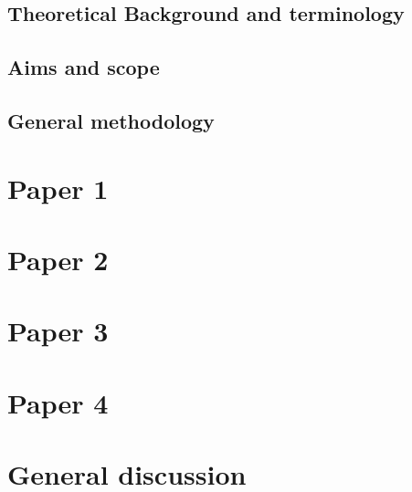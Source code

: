 \documentclass[11pt]{report}
\begin{document}
    \section{Theoretical Background and terminology}
    \label{sec:theory}
        

    \section{Aims and scope}
    \label{sec:aims_scope}
    

    \section{General methodology}
    \label{sec:methods}
    


\chapter{Paper 1}
\label{chap:paper1}

\chapter{Paper 2}
\label{chap:paper2}

\chapter{Paper 3}
\label{chap:paper3}

\chapter{Paper 4}
\label{chap:paper4}

\chapter{General discussion}
\label{chap:discussion}

\printbibliography
\end{document}
